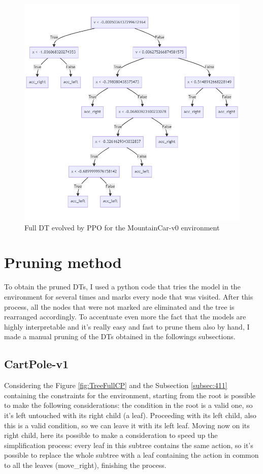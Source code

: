 \begin{figure}[h!]
    \centering
    \includegraphics[width=0.7\linewidth]{images/MountainCar/bestPPOcompleteMC.png}
    \caption{Full DT evolved by PPO for the MountainCar-v0 environment}
    \label{fig:TreeFullMC}
\end{figure}

\newpage

\section{Pruning method}
\label{sec:prune}
To obtain the pruned DTs, I used a python code that tries the model in the environment for several times and marks every node that was visited. After this process, all the nodes that were not marked are eliminated and the tree is rearranged accordingly. To accentuate even more the fact that the models are highly interpretable and it's really easy and fast to prune them also by hand, I made a manual pruning of the DTs obtained in the followings subsections.

\subsection{CartPole-v1}
Considering the Figure \ref{fig:TreeFullCP} and the Subsection \ref{subsec:411} containing the constraints for the environment, starting from the root is possible to make the following considerations: the condition in the root is a valid one, so it's left untouched with its right child (a leaf). Proceeding with its left child, also this is a valid condition, so we can leave it with its left leaf. Moving now on its right child, here its possible to make a consideration to speed up the simplification process: every leaf in this subtree contains the same action, so it's possible to replace the whole subtree with a leaf containing the action in common to all the leaves (move\_right), finishing the process.

